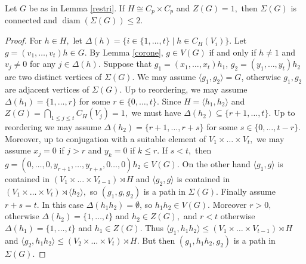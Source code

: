 \documentclass{amsart}
\DeclareMathOperator{\diam}{diam}
\numberwithin{equation}{section}
\begin{document}
\begin{lemma}
	Let $G$ be as in Lemma \ref{restri}. If $H \cong C_p\times C_p$ and $Z(G)= 1,$ then $\Sigma(G)$ is connected
	and $\diam(\Sigma(G))\leq 2.$
\end{lemma}
\begin{proof}
	For $h \in H,$ let $\Delta(h)=\{i \in \{1,\dots,t\}\mid h \in C_H(V_i)\}.$ %
	 Let $g=(v_1,\dots,v_t)h \in G.$ By Lemma \ref{corone}, $g\in V(G)$ if and only if $h\neq 1$ and $v_j\neq 0$ for any $j\in \Delta(h).$ Suppose that $g_1=(x_1,\dots,x_t)h_1$, $g_2=(y_1,\dots,y_t)h_2$ are two distinct vertices of $\Sigma(G).$ We may assume $\langle g_1, g_2\rangle=G$, otherwise $g_1,g_2$ are adjacent vertices of $\Sigma(G).$ Up to reordering, we may assume $\Delta(h_1)=\{1,\dots,r\}$ for some $r \in \{0,\dots,t\}.$ Since $H=\langle h_1, h_2\rangle$ and $Z(G)=\bigcap_{1\leq j \leq t}C_H(V_j)=1,$ we must have
	$\Delta(h_2)\subseteq \{r+1,\dots,t\}.$ Up to reordering we may assume $\Delta(h_2) = \{r+1,\dots,r+s\}$ for some $s \in \{0,\dots,t-r\}.$ Moreover, up to conjugation with a suitable element of $V_1\times \dots \times V_t,$ we may assume $x_j=0$ if $j > r$ and $y_k=0$ if $k\leq r.$
	If $s< t,$ then  $g=(0,\dots,0,y_{r+1},\dots,y_{r+s},0\dots,0)h_2\in V(G).$
	On the other hand $\langle g_1, g\rangle$ is
	 contained in $(V_1\times \dots \times V_{t-1})\rtimes H$ and $\langle g_2, g\rangle$ is contained in $(V_1\times \dots \times V_{t})\rtimes \langle h_2 \rangle,$
	 	 so $(g_1,g,g_2)$ is a path in $\Sigma(G).$ Finally assume $r+s=t.$ In this case $\Delta(h_1h_2)=\emptyset$, so $h_1h_2\in V(G)$. Moreover $r>0,$ otherwise $\Delta(h_2)=\{1,\dots,t\}$ and $h_2 \in Z(G),$
	and $r<t$ otherwise $\Delta(h_1)=\{1,\dots,t\}$ and $h_1 \in Z(G).$
	Thus $\langle g_1, h_1h_2\rangle\leq (V_1\times \dots \times V_{t-1})\rtimes H$ and  $\langle g_2, h_1h_2\rangle \leq (V_2\times \dots \times V_{t})\rtimes H$. But then
$(g_1,h_1h_2,g_2)$ is a path in $\Sigma(G).$ 
\end{proof}
\end{document}
